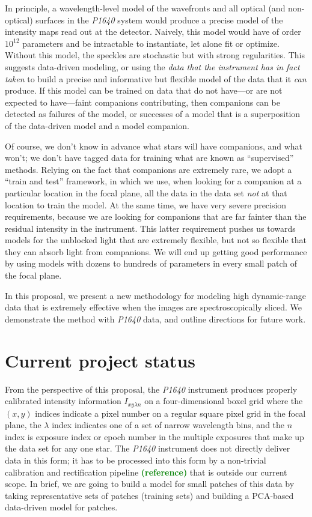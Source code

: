 \documentclass[12pt,pdftex,preprint]{aastex}
\newcommand{\project}[1]{\textsl{#1}}
\newcommand{\rob}[1]{\textbf{\textcolor{green}{#1}}}
\begin{document}
In principle, a wavelength-level model of the wavefronts and all
optical (and non-optical) surfaces in the \project{P1640} system would
produce a precise model of the intensity maps read out at the
detector.  Naively, this model would have of order $10^{12}$
parameters and be intractable to instantiate, let alone fit or
optimize.  Without this model, the speckles are stochastic but with
strong regularities.  This suggests data-driven modeling, or using the
\emph{data that the instrument has in fact taken} to build a precise
and informative but flexible model of the data that it \emph{can}
produce.  If this model can be trained on data that do not have---or
are not expected to have---faint companions contributing, then
companions can be detected as failures of the model, or successes of a
model that is a superposition of the data-driven model and a model
companion.

Of course, we don't know in advance what stars will have companions,
and what won't; we don't have tagged data for training what are known
as ``supervised'' methods.  Relying on the fact that companions are
extremely rare, we adopt a ``train and test'' framework, in which we
use, when looking for a companion at a particular location in the
focal plane, all the data in the data set \emph{not} at that location
to train the model.  At the same time, we have very severe precision
requirements, because we are looking for companions that are far
fainter than the residual intensity in the instrument.  This latter
requirement pushes us towards models for the unblocked light that are
extremely flexible, but not so flexible that they can absorb light
from companions.  We will end up getting good performance by using
models with dozens to hundreds of parameters in every small patch of
the focal plane.

In this proposal, we present a new methodology for modeling high
dynamic-range data that is extremely effective when the images are
spectroscopically sliced.  We demonstrate the method with
\project{P1640} data, and outline directions for future work.

\section{Current project status}

From the perspective of this proposal, the \project{P1640}
instrument produces properly calibrated intensity information $I_{x y
 \lambda n}$ on a four-dimensional boxel grid where the $(x, y)$
indices indicate a pixel number on a regular square pixel grid in the
focal plane, the $\lambda$ index indicates one of a set of narrow
wavelength bins, and the $n$ index is exposure index or epoch number
in the multiple exposures that make up the data set for any one star.
The \project{P1640} instrument does not directly deliver data in this
form; it has to be processed into this form by a non-trivial
calibration and rectification pipeline \rob{(reference)} that is outside our
current scope.  In brief, we are going to build a model for small
patches of this data by taking representative sets of patches
(training sets) and building a PCA-based data-driven model for
patches.
\end{document}
